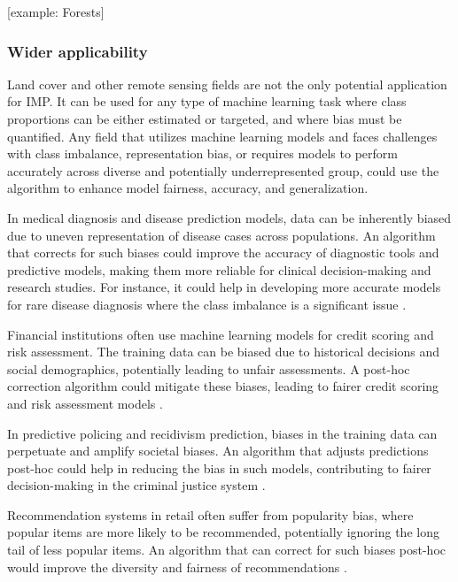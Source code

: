             [example: Forests]

        \subsubsection{Wider applicability}
        
            Land cover and other remote sensing fields are not the only potential application for IMP. It can be used for any type of machine learning task where class proportions can be either estimated or targeted, and where bias must be quantified. Any field that utilizes machine learning models and faces challenges with class imbalance, representation bias, or requires models to perform accurately across diverse and potentially underrepresented group, could use the algorithm to enhance model fairness, accuracy, and generalization.

            In medical diagnosis and disease prediction models, data can be inherently biased due to uneven representation of disease cases across populations. An algorithm that corrects for such biases could improve the accuracy of diagnostic tools and predictive models, making them more reliable for clinical decision-making and research studies. For instance, it could help in developing more accurate models for rare disease diagnosis where the class imbalance is a significant issue \citep{weiss2004mining,krawczyk2016learning}.

            Financial institutions often use machine learning models for credit scoring and risk assessment. The training data can be biased due to historical decisions and social demographics, potentially leading to unfair assessments. A post-hoc correction algorithm could mitigate these biases, leading to fairer credit scoring and risk assessment models \citep{chen2018why, kamiran2012data}.

            In predictive policing and recidivism prediction, biases in the training data can perpetuate and amplify societal biases. An algorithm that adjusts predictions post-hoc could help in reducing the bias in such models, contributing to fairer decision-making in the criminal justice system \citep{berk2021fairness, dressel2018accuracy}.

            Recommendation systems in retail often suffer from popularity bias, where popular items are more likely to be recommended, potentially ignoring the long tail of less popular items. An algorithm that can correct for such biases post-hoc would improve the diversity and fairness of recommendations \citep{abdollahpouri2019managing}.
    
